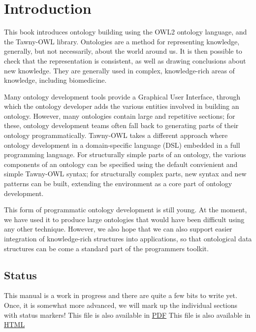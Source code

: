 \chapter{Introduction}
\label{cha:introduction}

This book introduces ontology building using the OWL2 ontology language, and
the Tawny-OWL library. Ontologies are a method for representing knowledge,
generally, but not necessarily, about the world around us. It is then possible
to check that the representation is consistent, as well as drawing conclusions
about new knowledge. They are generally used in complex, knowledge-rich areas
of knowledge, including biomedicine.

Many ontology development tools provide a Graphical User Interface, through
which the ontology developer adds the various entities involved in building an
ontology. However, many ontologies contain large and repetitive sections; for
these, ontology development teams often fall back to generating parts of their
ontology programmatically. Tawny-OWL takes a different approach where ontology
development in a domain-specific language (DSL) embedded in a full programming
language. For structurally simple parts of an ontology, the various components
of an ontology can be specified using the default convienient and simple
Tawny-OWL syntax; for structurally complex parts, new syntax and new patterns
can be built, extending the environment as a core part of ontology
development.

This form of programmatic ontology development is still young. At the moment,
we have used it to produce large ontologies that would have been difficult
using any other technique. However, we also hope that we can also support
easier integration of knowledge-rich structures into applications, so that
ontological data structures can be come a standard part of the programmers
toolkit.


\section{Status}
\label{sec:status}

This manual is a work in progress and there are quite a few bits to write yet.
Once, it is somewhat more advanced, we will mark up the individual sections
with status markers!
\ifdefined\HCode
This file is also available in \href{http://homepages.cs.ncl.ac.uk/phillip.lord/take-wing/take_wing.pdf}{PDF}
\else
This file is also available in \href{http://homepages.cs.ncl.ac.uk/phillip.lord/take-wing/take_wing.html}{HTML}
\fi

